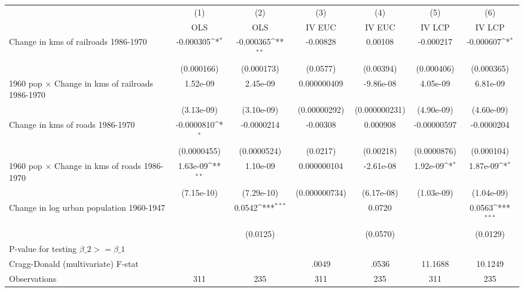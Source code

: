 {
\def\sym#1{\ifmmode^{#1}\else\(^{#1}\)\fi}
\begin{tabular}{l*{6}{c}}
\hline\hline
                &\multicolumn{1}{c}{(1)}&\multicolumn{1}{c}{(2)}&\multicolumn{1}{c}{(3)}&\multicolumn{1}{c}{(4)}&\multicolumn{1}{c}{(5)}&\multicolumn{1}{c}{(6)}\\
                &\multicolumn{1}{c}{OLS}&\multicolumn{1}{c}{OLS}&\multicolumn{1}{c}{IV EUC}&\multicolumn{1}{c}{IV EUC}&\multicolumn{1}{c}{IV LCP}&\multicolumn{1}{c}{IV LCP}\\
\hline
Change in kms of railroads 1986-1970&-0.000305\sym{*}  &-0.000365\sym{**} & -0.00828         &  0.00108         &-0.000217         &-0.000607\sym{*}  \\
                &(0.000166)         &(0.000173)         & (0.0577)         &(0.00394)         &(0.000406)         &(0.000365)         \\
[1em]
1960 pop $\times$ Change in kms of railroads 1986-1970& 1.52e-09         & 2.45e-09         &0.000000409         &-9.86e-08         & 4.05e-09         & 6.81e-09         \\
                &(3.13e-09)         &(3.10e-09)         &(0.00000292)         &(0.000000231)         &(4.90e-09)         &(4.60e-09)         \\
[1em]
Change in kms of roads 1986-1970&-0.0000810\sym{*}  &-0.0000214         & -0.00308         & 0.000908         &-0.00000597         &-0.0000204         \\
                &(0.0000455)         &(0.0000524)         & (0.0217)         &(0.00218)         &(0.0000876)         &(0.000104)         \\
[1em]
1960 pop $\times$ Change in kms of roads 1986-1970& 1.63e-09\sym{**} & 1.10e-09         &0.000000104         &-2.61e-08         & 1.92e-09\sym{*}  & 1.87e-09\sym{*}  \\
                &(7.15e-10)         &(7.29e-10)         &(0.000000734)         &(6.17e-08)         &(1.03e-09)         &(1.04e-09)         \\
[1em]
Change in log urban population 1960-1947&                  &   0.0542\sym{***}&                  &   0.0720         &                  &   0.0563\sym{***}\\
                &                  & (0.0125)         &                  & (0.0570)         &                  & (0.0129)         \\
\hline
P-value for testing $\beta\_{2} >= \beta\_{1}$&                  &                  &                  &                  &                  &                  \\
Cragg-Donald (multivariate) F-stat&                  &                  &    .0049         &    .0536         &  11.1688         &  10.1249         \\
Observations    &      311         &      235         &      311         &      235         &      311         &      235         \\
\hline\hline
\end{tabular}
}

